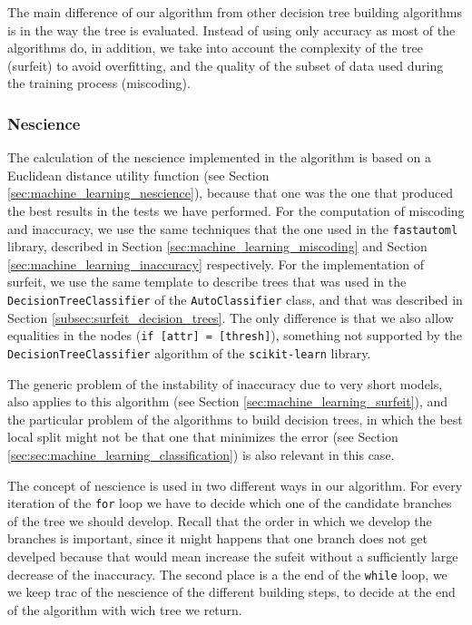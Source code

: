 The main difference of our algorithm from other decision tree building algorithms is in the way the tree is evaluated. Instead of using only accuracy as most of the algorithms do, in addition, we take into account the complexity of the tree (surfeit) to avoid overfitting, and the quality of the subset of data used during the training process (miscoding).

\subsubsection*{Nescience}
\label{sub:tree_nescience}

The calculation of the nescience implemented in the algorithm is based on a Euclidean distance utility function (see Section \ref{sec:machine_learning_nescience}), because that one was the one that produced the best results in the tests we have performed. For the computation of miscoding and inaccuracy, we use the same techniques that the one used in the \texttt{fastautoml} library, described in Section \ref{sec:machine_learning_miscoding} and Section \ref{sec:machine_learning_inaccuracy} respectively. For the implementation of surfeit, we use the same template to describe trees that was used in the \texttt{DecisionTreeClassifier} of the \texttt{AutoClassifier} class, and that was described in Section \ref{subsec:surfeit_decision_trees}. The only difference is that we also allow equalities in the nodes (\texttt{if [attr] = [thresh]}), something not supported by the \texttt{DecisionTreeClassifier} algorithm of the \texttt{scikit-learn} library.

The generic problem of the instability of inaccuracy due to very short models, also applies to this algorithm (see Section \ref{sec:machine_learning_surfeit}), and the particular problem of the algorithms to build decision trees, in which the best local split might not be that one that minimizes the error (see Section \ref{sec:sec:machine_learning_classification}) is also relevant in this case.

The concept of nescience is used in two different ways in our algorithm. For every iteration of the \texttt{for} loop we have to decide which one of the candidate branches of the tree we should develop. Recall that the order in which we develop the branches is important, since it might happens that one branch does not get develped because that would mean increase the sufeit without a sufficiently large decrease of the inaccuracy. The second place is a the end of the \texttt{while} loop, we we keep trac of the nescience of the different building steps, to decide at the end of the algorithm with wich tree we return.

